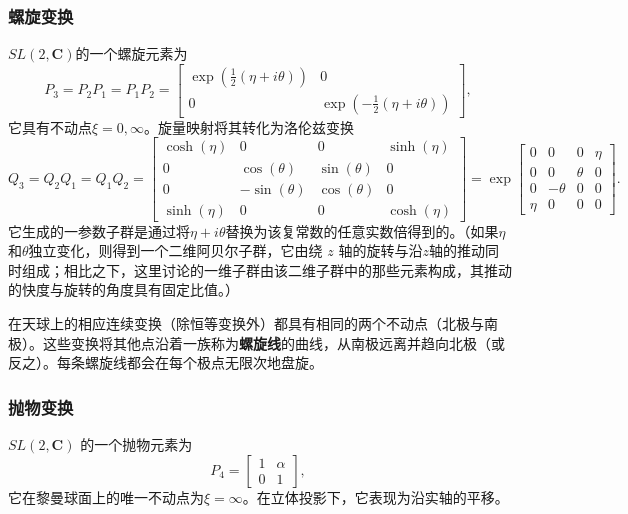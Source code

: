 \subsubsection{螺旋变换}
$SL(2,\mathbf{C})$的一个螺旋元素为
\[
P_{3} = P_{2}P_{1} = P_{1}P_{2} =
\begin{bmatrix}
\exp\!\left(\tfrac{1}{2}(\eta + i\theta)\right) & 0 \\
0 & \exp\!\left(-\tfrac{1}{2}(\eta + i\theta)\right)
\end{bmatrix},~
\]
它具有不动点$\xi = 0, \infty$。旋量映射将其转化为洛伦兹变换
\[
Q_{3} = Q_{2}Q_{1} = Q_{1}Q_{2} =
\begin{bmatrix}
\cosh(\eta) & 0 & 0 & \sinh(\eta) \\
0 & \cos(\theta) & \sin(\theta) & 0 \\
0 & -\sin(\theta) & \cos(\theta) & 0 \\
\sinh(\eta) & 0 & 0 & \cosh(\eta)
\end{bmatrix}
=
\exp\!\begin{bmatrix}
0 & 0 & 0 & \eta \\
0 & 0 & \theta & 0 \\
0 & -\theta & 0 & 0 \\
\eta & 0 & 0 & 0
\end{bmatrix}.~
\]
它生成的一参数子群是通过将$\eta + i\theta$替换为该复常数的任意实数倍得到的。（如果$\eta$和$\theta$独立变化，则得到一个二维阿贝尔子群，它由绕 $z$ 轴的旋转与沿$z$轴的推动同时组成；相比之下，这里讨论的一维子群由该二维子群中的那些元素构成，其推动的快度与旋转的角度具有固定比值。）

在天球上的相应连续变换（除恒等变换外）都具有相同的两个不动点（北极与南极）。这些变换将其他点沿着一族称为\textbf{螺旋线}的曲线，从南极远离并趋向北极（或反之）。每条螺旋线都会在每个极点无限次地盘旋。
\subsubsection{抛物变换}
$SL(2,\mathbf{C})$ 的一个抛物元素为
\[
P_{4} =
\begin{bmatrix}
1 & \alpha \\
0 & 1
\end{bmatrix},~
\]
它在黎曼球面上的唯一不动点为$\xi = \infty$。在立体投影下，它表现为沿实轴的平移。

